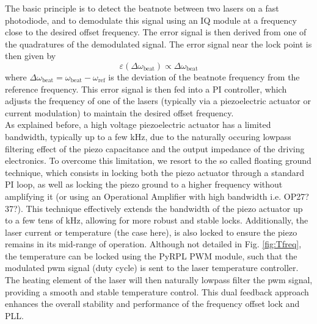 The basic principle is to detect the beatnote between two lasers on a fast photodiode, and to demodulate this signal using an IQ module at a frequency close to the desired offset frequency. The error signal is then derived from one of the quadratures of the demodulated signal. The error signal near the lock point is then given by
\begin{equation}
\varepsilon(\Delta \omega_{\mathrm{beat}}) \propto \Delta \omega_{\mathrm{beat}}
\end{equation}
where \( \Delta \omega_{\mathrm{beat}} = \omega_{\mathrm{beat}} - \omega_{\mathrm{ref}} \) is the deviation of the beatnote frequency from the reference frequency. This error signal is then fed into a PI controller, which adjusts the frequency of one of the lasers (typically via a piezoelectric actuator or current modulation) to maintain the desired offset frequency. \\

As explained before, a high voltage piezoelectric actuator has a limited bandwidth, typically up to a few kHz, due to the naturally occuring lowpass filtering effect of the piezo capacitance and the output impedance of the driving electronics. To overcome this limitation, we resort to the so called floating ground technique, which consists in locking both the piezo actuator through a standard PI loop, as well as locking the piezo ground to a higher frequency without amplifying it (or using an Operational Amplifier with high bandwidth i.e. OP27? 37?). This technique effectively extends the bandwidth of the piezo actuator up to a few tens of kHz, allowing for more robust and stable locks. Additionally, the laser current or temperature (the case here), is also locked to ensure the piezo remains in its mid-range of operation. Although not detailed in Fig. \ref{fig:Tfreq}, the temperature can be locked using the PyRPL PWM module, such that the modulated pwm signal (duty cycle) is sent to the laser temperature controller. The heating element of the laser will then naturally lowpass filter the pwm signal, providing a smooth and stable temperature control. This dual feedback approach enhances the overall stability and performance of the frequency offset lock and PLL. \\

